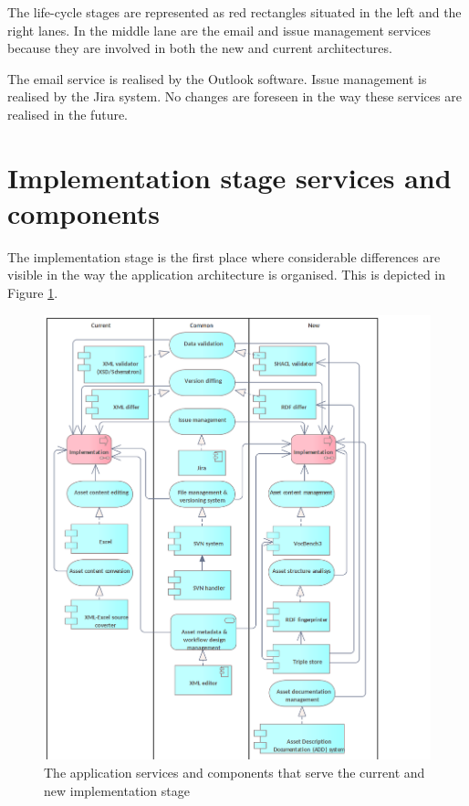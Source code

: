 	The life-cycle stages are represented as red rectangles situated in the left and the right lanes. In the middle lane are the email and issue management services because they are involved in both the new and current architectures. 
	
	The email service is realised by the Outlook software. Issue management is realised by the Jira system. No changes are foreseen in the way these services are realised in the future. 

	\section{Implementation stage services and components}
	\label{sec:implementation-application}	
	
	The implementation stage is the first place where considerable differences are visible in the way the application architecture is organised. This is depicted in Figure \ref{fig:application-implementation}.
	
	\begin{figure}[!h]
		\centering
		\includegraphics[width=.9\textwidth]{images/application/Implementation v3.png}
		\caption{The application services and components that serve the current and new implementation stage}
		\label{fig:application-implementation}
	\end{figure}
	
